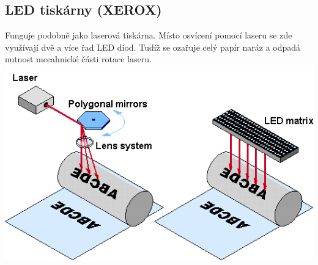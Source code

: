   \subsection{LED tiskárny (XEROX)}
    Funguje podobně jako laserová tiskárna.
    Místo osvícení pomocí laseru se zde využívají dvě a více řad LED diod.
    Tudíž se ozařuje celý papír naráz a odpadá nutnost mecahnické části rotace laseru.\\
    \includegraphics[width=1\linewidth]{TVY-POS/Laserové a LED tiskárny/LEDandLaserPrinter.png}